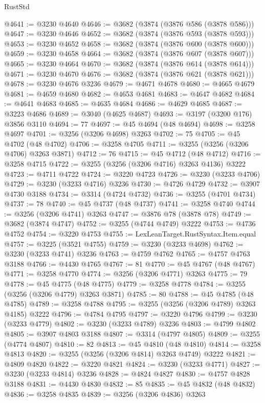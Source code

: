 \begin{lexlean}{RustStd}
\begin{coremodule}
{\begin{coremodule}
{{{{{{{{{{{{{{{{{{{{{{{{{{{{{{{{{{{{{@4641 := @3230 @4640
@4646 := @3682 (@3874 (@3876 @586 (@3878 @586)))
@4647 := @3230 @4646
@4652 := @3682 (@3874 (@3876 @593 (@3878 @593)))
@4653 := @3230 @4652
@4658 := @3682 (@3874 (@3876 @600 (@3878 @600)))
@4659 := @3230 @4658
@4664 := @3682 (@3874 (@3876 @607 (@3878 @607)))
@4665 := @3230 @4664
@4670 := @3682 (@3874 (@3876 @614 (@3878 @614)))
@4671 := @3230 @4670
@4676 := @3682 (@3874 (@3876 @621 (@3878 @621)))
@4678 := @3230 @4676 @3236
@4679 := @4671 @4678
@4680 := @4665 @4679
@4681 := @4659 @4680
@4682 := @4653 @4681
@4683 := @4647 @4682
@4684 := @4641 @4683
@4685 := @4635 @4684
@4686 := @4629 @4685
@4687 := @3223 @4686
@4689 := @3040 (@4625 @4687)
@4693 := @3197 (@3200 @176) @3856 @3110
@4694 := 77
@4697 := @45 @4694 (@48 @4694)
@4698 := @3258 @4697
@4701 := @3256 (@3206 @4698) @3263
@4702 := 75
@4705 := @45 @4702 (@48 @4702)
@4706 := @3258 @4705
@4711 := @3255 (@3256 (@3206 @4706) @3263 @3871)
@4712 := 76
@4715 := @45 @4712 (@48 @4712)
@4716 := @3258 @4715
@4722 := @3255 (@3256 (@3206 @4716) @3263 @4136) @3222
@4723 := @4711 @4722
@4724 := @3220 @4723
@4726 := @3230 (@3233 @4706)
@4729 := @3230 (@3233 @4716) @3236
@4730 := @4726 @4729
@4732 := @3907 @4730 @3188
@4734 := @3314 (@4724 @4732)
@4736 := @3255 (@4701 @4734)
@4737 := 78
@4740 := @45 @4737 (@48 @4737)
@4741 := @3258 @4740
@4744 := @3256 (@3206 @4741) @3263
@4747 := @3876 @78 (@3878 @78)
@4749 := @3682 (@3874 @4747)
@4752 := @3255 (@4744 @4749) @3222
@4753 := @4736 @4752
@4754 := @3220 @4753
@4755 := LexLeanTarget.RustSyntax.Item.equal
@4757 := @3225 (@3521 @4755)
@4759 := @3230 (@3233 @4698)
@4762 := @3230 (@3233 @4741) @3236
@4763 := @4759 @4762
@4765 := @4757 @4763 @3188
@4766 := @4430 @4765
@4767 := 81
@4770 := @45 @4767 (@48 @4767)
@4771 := @3258 @4770
@4774 := @3256 (@3206 @4771) @3263
@4775 := 79
@4778 := @45 @4775 (@48 @4775)
@4779 := @3258 @4778
@4784 := @3255 (@3256 (@3206 @4779) @3263 @3871)
@4785 := 80
@4788 := @45 @4785 (@48 @4785)
@4789 := @3258 @4788
@4795 := @3255 (@3256 (@3206 @4789) @3263 @4185) @3222
@4796 := @4784 @4795
@4797 := @3220 @4796
@4799 := @3230 (@3233 @4779)
@4802 := @3230 (@3233 @4789) @3236
@4803 := @4799 @4802
@4805 := @3907 @4803 @3188
@4807 := @3314 (@4797 @4805)
@4809 := @3255 (@4774 @4807)
@4810 := 82
@4813 := @45 @4810 (@48 @4810)
@4814 := @3258 @4813
@4820 := @3255 (@3256 (@3206 @4814) @3263 @4749) @3222
@4821 := @4809 @4820
@4822 := @3220 @4821
@4824 := @3230 (@3233 @4771)
@4827 := @3230 (@3233 @4814) @3236
@4828 := @4824 @4827
@4830 := @4757 @4828 @3188
@4831 := @4430 @4830
@4832 := 85
@4835 := @45 @4832 (@48 @4832)
@4836 := @3258 @4835
@4839 := @3256 (@3206 @4836) @3263
}}}}}}}}}}}}}}}}}}}}}}}}}}}}}}}}}}}}}
\end{coremodule}}
\end{coremodule}
\end{lexlean}
